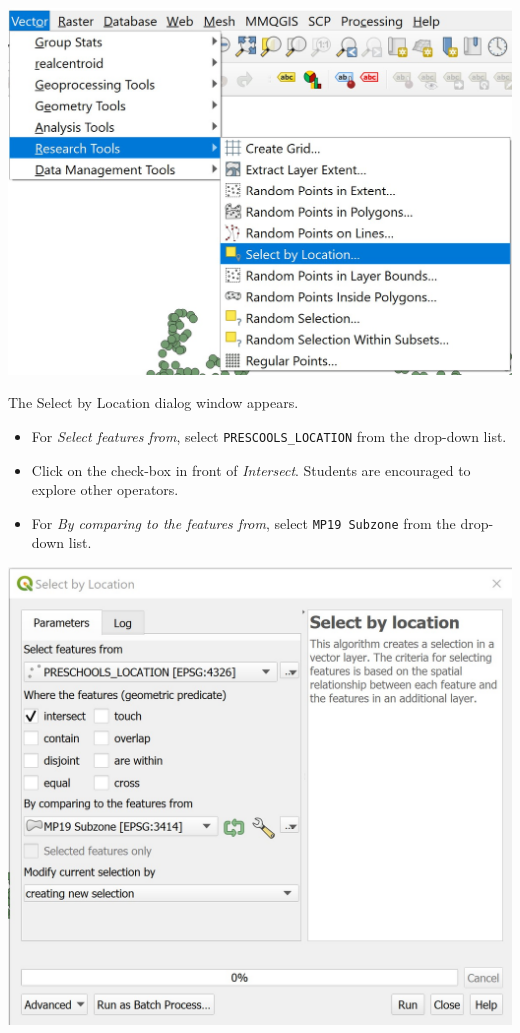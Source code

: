 \documentclass[
  letterpaper,
  DIV=11,
  numbers=noendperiod]{scrreprt}
\providecommand{\tightlist}{%
  \setlength{\itemsep}{0pt}\setlength{\parskip}{0pt}}\usepackage{longtable,booktabs,array}
\begin{document}
\includegraphics[width=9.30208in,height=\textheight]{./img04/image93.jpg}

The Select by Location dialog window appears.

\begin{itemize}
\tightlist
\item
  For \emph{Select features from}, select \texttt{PRESCOOLS\_LOCATION}
  from the drop-down list.
\item
  Click on the check-box in front of \emph{Intersect}. Students are
  encouraged to explore other operators.
\item
  For \emph{By comparing to the features from}, select
  \texttt{MP19\ Subzone} from the drop-down list.
\end{itemize}

\includegraphics{./img04/image94.jpg}
\end{document}
